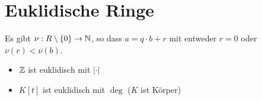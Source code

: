 \section*{Euklidische Ringe}
Es gibt $\nu: R \setminus \{0\} \to \mathbb{N}$, so dass $a = q \cdot b + r$ mit entweder $r = 0$ oder $\nu(r) < \nu(b)$.

\begin{itemize}
	\item $\mathbb{Z}$ ist euklidisch mit $|\cdot|$
	\item $K[t]$ ist euklidisch mit $\deg$ ($K$ ist Körper)
\end{itemize}
